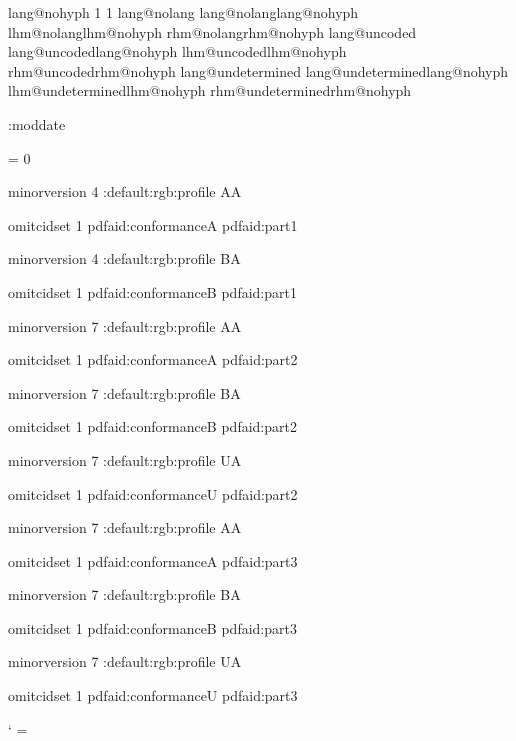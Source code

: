 \def\newnameddialect#1#2{%
    \expandafter\chardef\csname lang@#2\endcsname\csname lang@#1\endcsname
    \expandafter\chardef\csname lhm@#2\endcsname\csname lhm@#1\endcsname
    \expandafter\chardef\csname rhm@#2\endcsname\csname rhm@#1\endcsname}

\ifcsname lang@nohyph\endcsname \else
     1 1 \fi
\ifcsname lang@nolang\endcsname \else
    \newnameddialect {nohyph} {nolang} \fi
\ifcsname lang@uncoded\endcsname \else
    \newnameddialect {nohyph} {uncoded} \fi
\ifcsname lang@undetermined\endcsname \else
    \newnameddialect {nohyph} {undetermined} \fi



\newtoks\setembeddedfilesmoddate
    \setembeddedfilesmoddate{}
\newtoks\embeddedfiles:moddate
\def\minim:makedefaultmoddate{%
    \expandafter\edef\expandafter
        \minim:tmp\expandafter{\the\setembeddedfilesmoddate}%
    \embeddedfiles:moddate\expandafter{\minim:tmp}}


\newcount \pdfaconformancelevel
\pdfaconformancelevel = 0

\def\pdfalevel#1#2{%
    \global\pdfaconformancelevel=#1\relax
    \ifcsname minim:pdfa:#1#2\endcsname \lastnamedcs\else
        \errmessage{Unknown pdf/a standard pdf/a-#1}\fi}

\def\minim:pdfasettings#1#2#3{%
    \pdfvariable minorversion #1\relax
    \minim:default:rgb:profile
    \if#2A\writedocumentstructure1\fi
    
    \pdfvariable omitcidset 1
    \setmetadata pdfaid:conformance{#2}%
    \setmetadata pdfaid:part{#3}}

\expandafter\def\csname minim:pdfa:1a\endcsname{\minim:pdfasettings 4A1}
\expandafter\def\csname minim:pdfa:1b\endcsname{\minim:pdfasettings 4B1}
\expandafter\def\csname minim:pdfa:2a\endcsname{\minim:pdfasettings 7A2}
\expandafter\def\csname minim:pdfa:2b\endcsname{\minim:pdfasettings 7B2}
\expandafter\def\csname minim:pdfa:2u\endcsname{\minim:pdfasettings 7U2}
\expandafter\def\csname minim:pdfa:3a\endcsname{\minim:pdfasettings 7A3}
\expandafter\def\csname minim:pdfa:3b\endcsname{\minim:pdfasettings 7B3}
\expandafter\def\csname minim:pdfa:3u\endcsname{\minim:pdfasettings 7U3}


\catcode`\: = \minimpdfloaded

